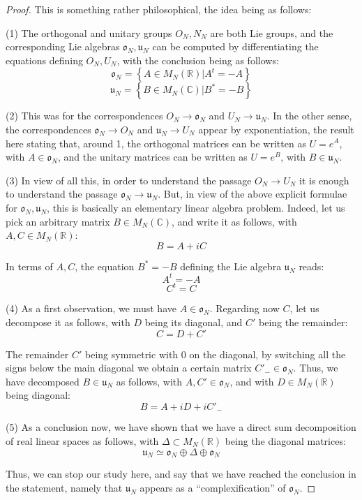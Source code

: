 \documentclass[12pt]{amsbook}
\begin{document}
\begin{proof}
This is something rather philosophical, the idea being as follows:

\medskip

(1) The orthogonal and unitary groups $O_N,N_N$ are both Lie groups, and the corresponding Lie algebras $\mathfrak o_N,\mathfrak u_N$ can be computed by differentiating the equations defining $O_N,U_N$, with the conclusion being as follows:
$$\mathfrak o_N=\left\{ A\in M_N(\mathbb R)\Big|A^t=-A\right\}$$
$$\mathfrak u_N=\left\{ B\in M_N(\mathbb C)\Big|B^*=-B\right\}$$

(2) This was for the correspondences $O_N\to\mathfrak o_N$ and $U_N\to\mathfrak u_N$. In the other sense, the correspondences $\mathfrak o_N\to O_N$ and $\mathfrak u_N\to U_N$ appear by exponentiation, the result here stating that, around 1, the orthogonal matrices can be written as $U=e^A$, with $A\in\mathfrak o_N$, and the unitary matrices can be written as $U=e^B$, with $B\in\mathfrak u_N$. 

\bigskip

(3) In view of all this, in order to understand the passage $O_N\to U_N$ it is enough to understand the passage $\mathfrak o_N\to\mathfrak u_N$. But, in view of the above explicit formulae for $\mathfrak o_N,\mathfrak u_N$, this is basically an elementary linear algebra problem. Indeed, let us pick an arbitrary matrix $B\in M_N(\mathbb C)$, and write it as follows, with $A,C\in M_N(\mathbb R)$:
$$B=A+iC$$

In terms of $A,C$, the equation $B^*=-B$ defining the Lie algebra $\mathfrak u_N$ reads:
$$A^t=-A$$
$$C^t=C$$

(4) As a first observation, we must have $A\in\mathfrak o_N$. Regarding now $C$, let us decompose it as follows, with $D$ being its diagonal, and $C'$ being the remainder:
$$C=D+C'$$

The remainder $C'$ being symmetric with 0 on the diagonal, by switching all the signs below the main diagonal we obtain a certain matrix $C'_-\in\mathfrak o_N$. Thus, we have decomposed $B\in\mathfrak u_N$ as follows, with $A,C'\in\mathfrak o_N$, and with $D\in M_N(\mathbb R)$ being diagonal:
$$B=A+iD+iC'_-$$

(5) As a conclusion now, we have shown that we have a direct sum decomposition of real linear spaces as follows, with $\Delta\subset M_N(\mathbb R)$ being the diagonal matrices:
$$\mathfrak u_N\simeq\mathfrak o_N\oplus\Delta\oplus\mathfrak o_N$$

Thus, we can stop our study here, and say that we have reached the conclusion in the statement, namely that $\mathfrak u_N$ appears as a ``complexification'' of $\mathfrak o_N$.
\end{proof}
\end{document}
